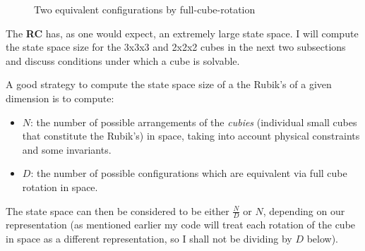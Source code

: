 \begin{figure}[H]
  \noindent
  \caption[Reducing RC]{Two equivalent configurations by full-cube-rotation}
  \label{fig:configurations}
\end{figure}

\noindent The \textbf{RC} has, as one would expect, an extremely large state space. I will compute the state space size for the 3x3x3 and 2x2x2 cubes in the next two subsections and discuss conditions under which a cube is solvable.

\label{Theory:333RCSSS}

A good strategy to compute the state space size of a the Rubik's of a given dimension is to compute:
\begin{itemize}
\item $N$: the number of possible arrangements of the \textit{cubies} (individual small cubes that constitute the Rubik's) in space, taking into account physical constraints and some invariants.
\item $D$: the number of possible configurations which are equivalent via full cube rotation in space.
\end{itemize}
The state space can then be considered to be either $\frac{N}{D}$ or $N$, depending on our representation (as mentioned earlier my code will treat each rotation of the cube in space as a different representation, so I shall not be dividing by $D$ below).

